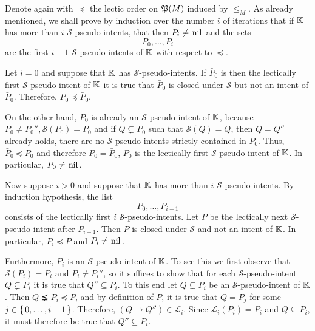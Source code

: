 \begin{Proof}
  Denote again with $\preceq$ the lectic order on ${\mathfrak{P}(M)}$ induced by $\leq_M$.  As
  already mentioned, we shall prove by induction over the number $i$ of iterations that if
  ${\mathbb{K}}$ has more than $i$ $\mathcal{S}$-pseudo-intents, that then $P_i \neq
  \text{\lstinline{nil}}$ and the sets
  \begin{equation*}
    P_0, \dots, P_i
  \end{equation*}
  are the first $i+1$ $\mathcal{S}$-pseudo-intents of ${\mathbb{K}}$ with respect to $\preceq$.

  Let $i = 0$ and suppose that ${\mathbb{K}}$ has $\mathcal{S}$-pseudo-intents.  If $\bar P_0$
  is then the lectically first $\mathcal{S}$-pseudo-intent of ${\mathbb{K}}$ it is true that
  $\bar P_0$ is closed under $\mathcal{S}$ but not an intent of $\bar P_0$.  Therefore,
  $P_0 \preceq \bar P_0$.

  On the other hand, $P_0$ is already an $\mathcal{S}$-pseudo-intent of ${\mathbb{K}}$, because
  $P_0 \neq P_0'', \mathcal{S}(P_0) = P_0$ and if $Q \subsetneq P_0$ such that
  $\mathcal{S}(Q) = Q$, then $Q = Q''$ already holds, \ie there are no
  $\mathcal{S}$-pseudo-intents strictly contained in $P_0$.  Thus, $\bar P_0 \preceq P_0$
  and therefore $P_0 = \bar P_0$, \ie $P_0$ is the lectically first
  $\mathcal{S}$-pseudo-intent of ${\mathbb{K}}$.  In particular, $P_0 \neq
  \text{\lstinline{nil}}$.

  Now suppose $i > 0$ and suppose that ${\mathbb{K}}$ has more than $i$
  $\mathcal{S}$-pseudo-intents.  By induction hypothesis, the list
  \begin{equation*}
    P_0, \dots, P_{i-1}
  \end{equation*}
  consists of the lectically first $i$ $\mathcal{S}$-pseudo-intents.  Let $P$ be the
  lectically next $\mathcal{S}$-pseudo-intent after $P_{i-1}$.  Then $P$ is closed under
  $\mathcal{S}$ and not an intent of ${\mathbb{K}}$.  In particular, $P_i \preceq P$ and $P_i
  \neq \text{\lstinline{nil}}$.

  Furthermore, $P_i$ is an $\mathcal{S}$-pseudo-intent of ${\mathbb{K}}$.  To see this we first
  observe that $\mathcal{S}(P_i) = P_i$ and $P_i \neq P_i''$, so it suffices to show that
  for each $\mathcal{S}$-pseudo-intent $Q \subsetneq P_i$ it is true that $Q'' \subseteq
  P_i$.  To this end let $Q \subsetneq P_i$ be an $\mathcal{S}$-pseudo-intent of ${\mathbb{K}}$.
  Then $Q \precneq P_i \preceq P$, and by definition of $P$, it is true that $Q = P_j$ for
  some $j \in {\ensuremath{\{\,0, \dots, i - 1\,\}}}$.  Therefore, $(Q \to Q'') \in \mathcal{L}_i$.  Since
  $\mathcal{L}_i(P_i) = P_i$ and $Q \subseteq P_i$, it must therefore be true that $Q''
  \subseteq P_i$.


\end{Proof}
